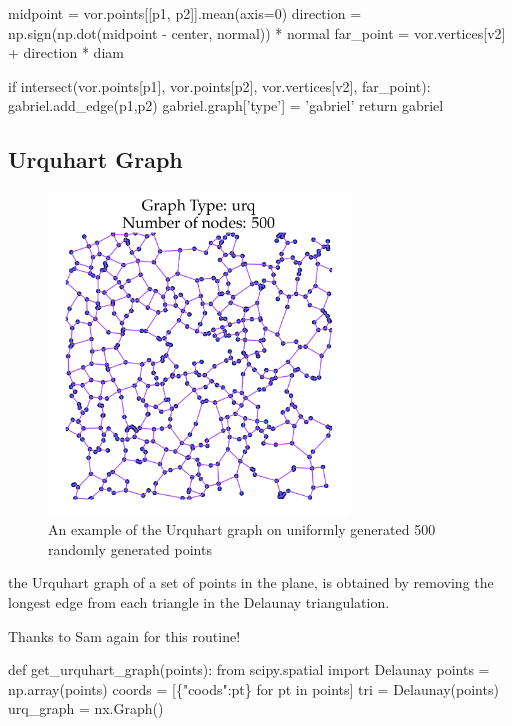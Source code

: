             midpoint = vor.points[[p1, p2]].mean(axis=0)
            direction = np.sign(np.dot(midpoint - center, normal)) * normal
            far_point = vor.vertices[v2] + direction * diam
            
            if intersect(vor.points[p1], vor.points[p2],
                         vor.vertices[v2], far_point):
                gabriel.add_edge(p1,p2)
    gabriel.graph['type'] = 'gabriel'
    return gabriel
\nwendcode{}\nwdocspar


\subsection{Urquhart Graph}

\begin{figure}[ht]
  \centering
  \includegraphics[width=8cm]{./miscimages/urquhart-example.png}
  \caption{\label{fig:urquhart-example} An example of the Urquhart graph on uniformly generated 500 randomly generated points}
\end{figure}

the Urquhart graph of a set of points in the plane, is obtained by removing the longest edge from each triangle in the Delaunay triangulation.

Thanks to Sam again for this routine!

\nwenddocs{}\plusendmoddef\nwstartdeflinemarkup{}\nwenddeflinemarkup
def get_urquhart_graph(points):
     from scipy.spatial import Delaunay
     points       = np.array(points)
     coords       = [\{"coods":pt\} for pt in points]
     tri          = Delaunay(points)
     urq_graph = nx.Graph()

